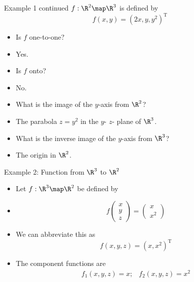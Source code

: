 \documentclass{beamer}
\begin{document}

\begin{frame}{Example 1 continued}
$f:\R^2\map\R^3$ is defined by
$$f(x,y) = (2x, y, y^2)^{\text{T}}$$
\begin{itemize}
\item Is $f$ one-to-one?
\item Yes.
\item Is $f$ onto?
\item No.
\item What is the image of the $y$-axis from $\R^2$?
\item The parabola $z=y^2$ in the $y$- $z$- plane of $\R^3$.
\item What is the inverse image of the $y$-axis from $\R^3$?
\item The origin in $\R^2$.
\end{itemize}
\end{frame}


\begin{frame}{Example 2: Function from $\R^3$ to $\R^2$}
\begin{itemize}
\item Let $f:\R^3\map\R^2$ be defined by
\item
$$
f
\begin{pmatrix}
x \\ y \\ z
\end{pmatrix}
=
\begin{pmatrix}
x \\ x^2
\end{pmatrix}
$$
\item We can abbreviate this as
$$f(x,y,z) = (x, x^2)^{\text{T}}$$
\item The component functions are
$$
\begin{matrix}
f_1(x,y,z) = x; & f_2(x,y,z) = x^2
\end{matrix}
$$
\end{itemize}
\end{frame}

\end{document}
